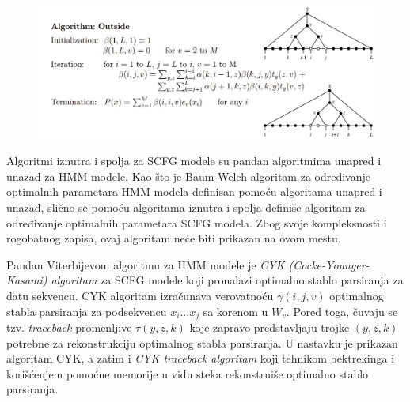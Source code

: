 \documentclass[a4paper, 12pt]{article}
\begin{document}
\begin{figure}[h!]
  \centering
  \vspace{-0.2cm}
  \includegraphics[width=\textwidth]{outside}
\end{figure}


Algoritmi iznutra i spolja za SCFG modele su pandan algoritmima unapred i unazad za HMM modele. Kao što je Baum-Welch algoritam za određivanje optimalnih parametara HMM modela definisan pomoću algoritama unapred i unazad, slično se pomoću algoritama iznutra i spolja definiše algoritam za određivanje optimalnih parametara SCFG modela. Zbog svoje kompleksnosti i rogobatnog zapisa, ovaj algoritam neće biti prikazan na ovom mestu.

\newpage

Pandan Viterbijevom algoritmu za HMM modele je \textit{CYK (Cocke-Younger-Kasami) algoritam} za SCFG modele koji pronalazi optimalno stablo parsiranja za datu sekvencu. CYK algoritam izračunava verovatnoću $\gamma(i, j, v)$ optimalnog stabla parsiranja za podsekvencu $x_i...x_j$ sa korenom u $W_v$. Pored toga, čuvaju se tzv. \textit{traceback} promenljive $\tau(y, z, k)$ koje zapravo predstavljaju trojke $(y, z, k)$ potrebne za rekonstrukciju optimalnog stabla parsiranja. U nastavku je prikazan algoritam CYK, a zatim i \textit{CYK traceback algoritam} koji tehnikom bektrekinga i korišćenjem pomoćne memorije u vidu steka rekonstruiše optimalno stablo parsiranja.
\end{document}
